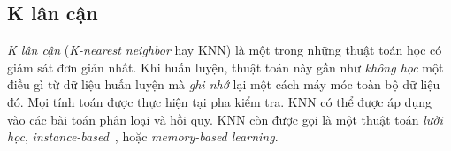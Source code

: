 \subsection{K lân cận}
\textit{K lân cận} (\textit{K-nearest neighbor} hay KNN) là một trong những
thuật toán học có giám sát đơn giản nhất. Khi huấn luyện, thuật toán này gần như
\textit{không học} một điều gì từ dữ liệu huấn luyện mà \textit{ghi nhớ} lại một
cách máy móc toàn bộ dữ liệu đó. Mọi tính toán được thực hiện tại pha kiểm
tra. KNN có thể được áp dụng vào các bài toán phân loại và hồi quy. KNN còn được
gọi là một thuật toán \textit{lười học},
\textit{instance-based}~\cite{aha1991instance}, hoặc \textit{memory-based
learning}.





